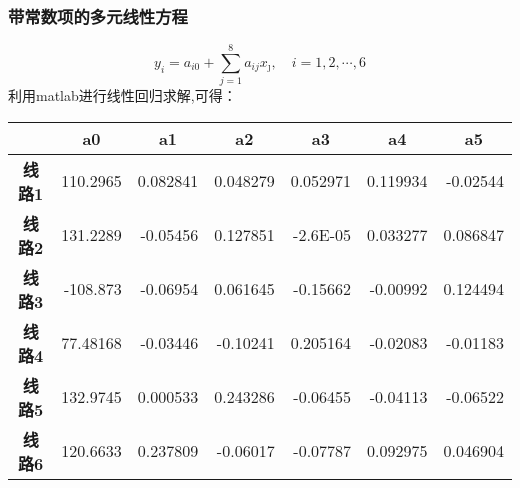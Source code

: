 \documentclass[12pt,a4paper]{ctexart}
\begin{document}
	\subsubsection*{带常数项的多元线性方程}
	\begin{equation} 
	y_{i}=a_{i 0}+\sum_{j=1}^{8} a_{i j} x_{\jmath}, \quad i=1,2, \cdots, 6
	\end{equation}
	利用matlab进行线性回归求解,可得：
\begin{longtable}{@{}crrrrrr@{}}
	&
	\multicolumn{1}{c}{\textbf{a0}} &
	\multicolumn{1}{c}{\textbf{a1}} &
	\multicolumn{1}{c}{\textbf{a2}} &
	\multicolumn{1}{c}{\textbf{a3}} &
	\multicolumn{1}{c}{\textbf{a4}} &
	\multicolumn{1}{c}{\textbf{a5}} \\* \cmidrule(l){2-7} 
	\endfirsthead
	\endhead
	\multicolumn{1}{c|}{\textbf{线路1}} &
	\multicolumn{1}{r|}{110.2965} &
	\multicolumn{1}{r|}{0.082841} &
	\multicolumn{1}{r|}{0.048279} &
	\multicolumn{1}{r|}{0.052971} &
	\multicolumn{1}{r|}{0.119934} &
	\multicolumn{1}{r|}{-0.02544} \\* \cmidrule(l){2-7} 
	\multicolumn{1}{c|}{\textbf{线路2}} &
	\multicolumn{1}{r|}{131.2289} &
	\multicolumn{1}{r|}{-0.05456} &
	\multicolumn{1}{r|}{0.127851} &
	\multicolumn{1}{r|}{-2.6E-05} &
	\multicolumn{1}{r|}{0.033277} &
	\multicolumn{1}{r|}{0.086847} \\* \cmidrule(l){2-7} 
	\multicolumn{1}{c|}{\textbf{线路3}} &
	\multicolumn{1}{r|}{-108.873} &
	\multicolumn{1}{r|}{-0.06954} &
	\multicolumn{1}{r|}{0.061645} &
	\multicolumn{1}{r|}{-0.15662} &
	\multicolumn{1}{r|}{-0.00992} &
	\multicolumn{1}{r|}{0.124494} \\* \cmidrule(l){2-7} 
	\multicolumn{1}{c|}{\textbf{线路4}} &
	\multicolumn{1}{r|}{77.48168} &
	\multicolumn{1}{r|}{-0.03446} &
	\multicolumn{1}{r|}{-0.10241} &
	\multicolumn{1}{r|}{0.205164} &
	\multicolumn{1}{r|}{-0.02083} &
	\multicolumn{1}{r|}{-0.01183} \\* \cmidrule(l){2-7} 
	\multicolumn{1}{c|}{\textbf{线路5}} &
	\multicolumn{1}{r|}{132.9745} &
	\multicolumn{1}{r|}{0.000533} &
	\multicolumn{1}{r|}{0.243286} &
	\multicolumn{1}{r|}{-0.06455} &
	\multicolumn{1}{r|}{-0.04113} &
	\multicolumn{1}{r|}{-0.06522} \\* \cmidrule(l){2-7} 
	\multicolumn{1}{c|}{\textbf{线路6}} &
	\multicolumn{1}{r|}{120.6633} &
	\multicolumn{1}{r|}{0.237809} &
	\multicolumn{1}{r|}{-0.06017} &
	\multicolumn{1}{r|}{-0.07787} &
	\multicolumn{1}{r|}{0.092975} &
	\multicolumn{1}{r|}{0.046904} \\* \cmidrule(l){2-7} 
\end{longtable}
	
\end{document}
